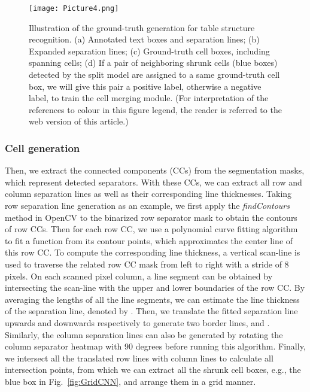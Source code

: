 \documentclass[final,3p,times,twocolumn]{elsarticle}
\begin{document}
\begin{figure}[t]
    \centering
    \setlength{\abovecaptionskip}{-0.3cm}
    \texttt{[image: Picture4.png]}
    \caption{Illustration of the ground-truth generation for table structure recognition. (a) Annotated text boxes and separation lines; (b) Expanded separation lines; (c) Ground-truth cell boxes, including spanning cells; (d) If a pair of neighboring shrunk cells (blue boxes) detected by the split model are assigned to a same ground-truth cell box, we will give this pair a positive label, otherwise a negative label, to train the cell merging module. (For interpretation of the references to colour in this figure legend, the reader is referred to the web version of this article.)}
    \label{fig:gt_generation}
\end{figure}

\subsubsection{Cell generation} 
\label{subsubsec:cell_generation}
{\color{black}{After separation line prediction, we first binarize the predicted row and column separator heatmaps with a classification score threshold, .}} Then, we extract the connected components (CCs) from the segmentation masks, which represent detected separators. With these CCs, we can extract all row and column separation lines as well as their corresponding line thicknesses. Taking row separation line generation as an example, we first apply the \textit{findContours} method in OpenCV \cite{bradski2000opencv} to the binarized row separator mask to obtain the contours of row CCs. Then for each row CC, we use a polynomial curve fitting algorithm to fit a function  from its contour points, which approximates the center line of this row CC. To compute the corresponding line thickness, a vertical scan-line is used to traverse the related row CC mask from left to right with a stride of 8 pixels. On each scanned pixel column, a line segment can be obtained by intersecting the scan-line with the upper and lower boundaries of the row CC. By averaging the lengths of all the line segments, we can estimate the line thickness of the separation line, denoted by . Then, we translate the fitted separation line  upwards and downwards respectively to generate two border lines,  and . Similarly, the column separation lines can also be generated by rotating the column separator heatmap with 90 degrees before running this algorithm. Finally, we intersect all the translated row lines with column lines to calculate all intersection points, from which we can extract all the shrunk cell boxes, e.g., the blue box in Fig.~\ref{fig:GridCNN}, and arrange them in a grid manner.
\end{document}
